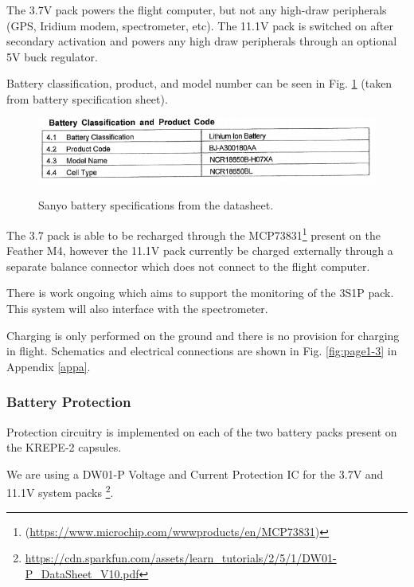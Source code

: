 \documentclass{article}
\begin{document}
The 3.7V pack powers the flight computer, but not any high-draw peripherals (GPS, Iridium modem, spectrometer, etc). The 11.1V pack is switched on after secondary activation and powers any high draw peripherals through an optional 5V buck regulator. 

Battery classification, product, and model number can be seen in Fig. \ref{fig:bat-spec} (taken from battery specification sheet).

\begin{figure}[h!]
	\centering
	\includegraphics[width=12cm]{images/battery-spec.png}
	\label{fig:bat-spec}
	\caption{Sanyo battery specifications from the datasheet.}
\end{figure}

The 3.7 pack is able to be recharged through the MCP73831\footnote{ (\url{https://www.microchip.com/wwwproducts/en/MCP73831})} present on the Feather M4, however the 11.1V pack currently be charged externally through a separate balance connector which does not connect to the flight computer.  

There is work ongoing which aims to support the monitoring of the 3S1P pack. This system will also interface with the spectrometer. 

Charging is only performed on the ground and there is no provision for charging in flight. Schematics and electrical connections are shown in Fig. \ref{fig:page1-3} in Appendix \ref{appa}.


\subsubsection{Battery Protection}
Protection circuitry is implemented on each of the two battery packs present on the KREPE-2 capsules. 

 We are using a DW01-P Voltage and Current Protection IC for the 3.7V and 11.1V system packs  \footnote{\url{https://cdn.sparkfun.com/assets/learn_tutorials/2/5/1/DW01-P_DataSheet_V10.pdf}}.
\end{document}
